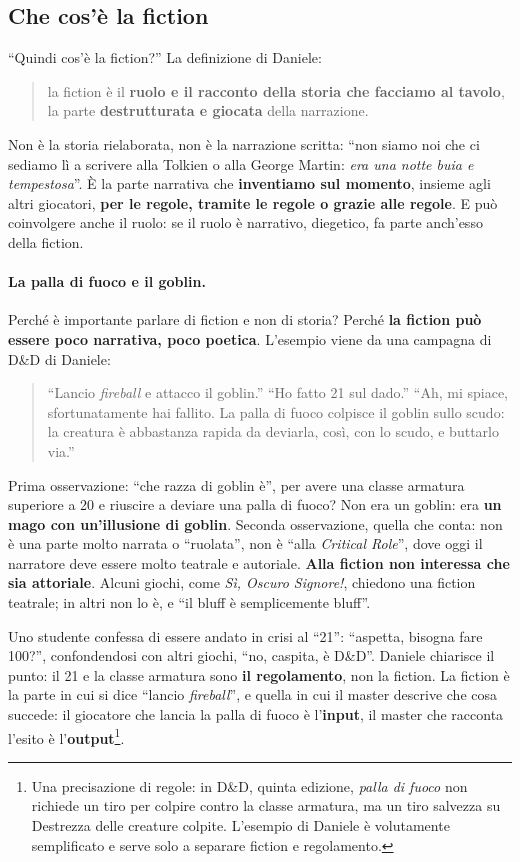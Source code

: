 \subsection{Che cos'è la fiction}

``Quindi cos'è la fiction?'' La definizione di Daniele:
\begin{quote}
la fiction è il \textbf{ruolo e il racconto della storia che facciamo al tavolo}, la parte
\textbf{destrutturata e giocata} della narrazione.
\end{quote}
Non è la storia rielaborata, non è la narrazione scritta: ``non siamo noi che ci sediamo lì a
scrivere alla Tolkien o alla George Martin: \emph{era una notte buia e tempestosa}''. È la parte
narrativa che \textbf{inventiamo sul momento}, insieme agli altri giocatori, \textbf{per le
regole, tramite le regole o grazie alle regole}. E può coinvolgere anche il ruolo: se il ruolo è
narrativo, diegetico, fa parte anch'esso della fiction.

\paragraph{La palla di fuoco e il goblin.} Perché è importante parlare di fiction e non di storia?
Perché \textbf{la fiction può essere poco narrativa, poco poetica}. L'esempio viene da una campagna
di D\&D di Daniele:
\begin{quote}
``Lancio \emph{fireball} e attacco il goblin.'' ``Ho fatto 21 sul dado.'' ``Ah, mi spiace,
sfortunatamente hai fallito. La palla di fuoco colpisce il goblin sullo scudo: la creatura è
abbastanza rapida da deviarla, così, con lo scudo, e buttarlo via.''
\end{quote}
Prima osservazione: ``che razza di goblin è'', per avere una classe armatura superiore a 20 e
riuscire a deviare una palla di fuoco? Non era un goblin: era \textbf{un mago con un'illusione di
goblin}. Seconda osservazione, quella che conta: non è una parte molto narrata o ``ruolata'',
non è ``alla \emph{Critical Role}'', dove oggi il narratore deve essere molto teatrale e
autoriale. \textbf{Alla fiction non interessa che sia attoriale}. Alcuni giochi, come \emph{Sì,
Oscuro Signore!}, chiedono una fiction teatrale; in altri non lo è, e ``il bluff è semplicemente
bluff''.

Uno studente confessa di essere andato in crisi al ``21'': ``aspetta, bisogna fare 100?'',
confondendosi con altri giochi, ``no, caspita, è D\&D''. Daniele chiarisce il punto: il 21 e la
classe armatura sono \textbf{il regolamento}, non la fiction. La fiction è la parte in cui si dice
``lancio \emph{fireball}'', e quella in cui il master descrive che cosa succede: il giocatore che
lancia la palla di fuoco è l'\textbf{input}, il master che racconta l'esito è
l'\textbf{output}\footnote{Una precisazione di regole: in D\&D, quinta edizione, \emph{palla di
fuoco} non richiede un tiro per colpire contro la classe armatura, ma un tiro salvezza su
Destrezza delle creature colpite. L'esempio di Daniele è volutamente semplificato e serve solo a
separare fiction e regolamento.}.

